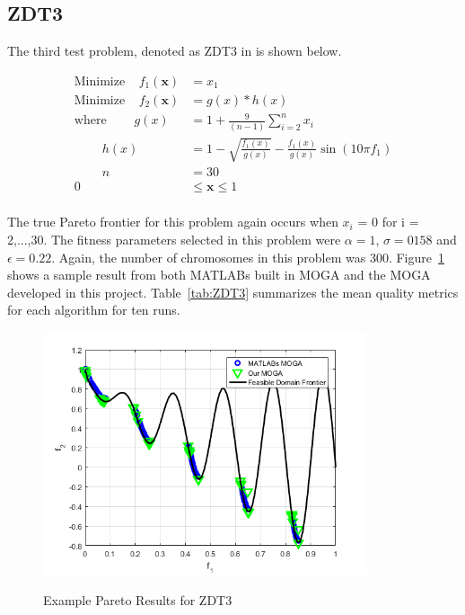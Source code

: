 \documentclass{article}
\begin{document}
\goodbreak

\newpage
\goodbreak
\subsection{ZDT3} 
The third test problem, denoted as ZDT3 in \cite{deb2001multi} is shown below. 


\begin{align*}
\textrm{Minimize} ~~~~~ f_1(\textbf{x}) &= x_1 \\
\textrm{Minimize} ~~~~~ f_2(\textbf{x}) &= g(x)*h(x) \\
\textrm{where} ~~~~~~~~~~ g(x) &= 1+\frac{9}{(n-1)}\sum_{i=2}^{n}x_i \\
~~~~~~~~~~ h(x) &= 1- \sqrt{\frac{f_1(x)}{g(x)}}- \frac{f_1(x)}{g(x)}\sin(10\pi f_1) \\
~~~~~~~~~~ n &= 30 \\
0 &\leq  \textbf{x}  \leq 1 \\
\end{align*}

\noindent The true Pareto frontier for this problem again occurs when $x_i$ = 0 for i = 2,...,30. The fitness parameters selected in this problem were $\alpha = 1$, $\sigma = 0158$ and $\epsilon = 0.22$. Again, the number of chromosomes in this problem was 300. Figure~\ref{fig:ZDT3} shows a sample result from both MATLABs built in MOGA and the MOGA developed in this project. Table~\ref{tab:ZDT3} summarizes the mean quality metrics for each algorithm for ten runs. \newline

\begin{figure}[H]
  \caption{Example Pareto Results for ZDT3}
  \centering
  \includegraphics[width=0.85\textwidth]{ZDT3_pareto_final.png}  
  \label{fig:ZDT3}
\end{figure}
\end{document}
